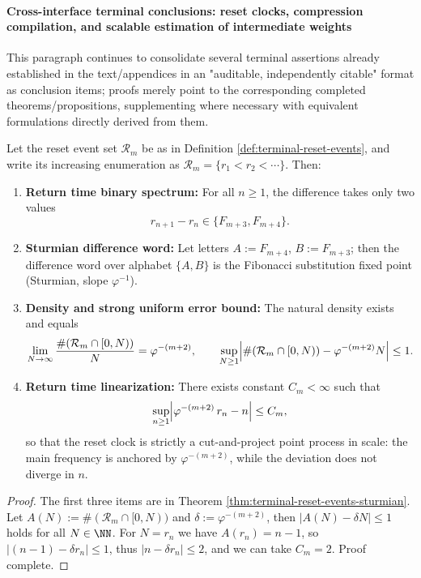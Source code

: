 \paragraph{Cross-interface terminal conclusions: reset clocks, compression compilation, and scalable estimation of intermediate weights}
This paragraph continues to consolidate several terminal assertions already established in the text/appendices in an "auditable, independently citable" format as conclusion items; proofs merely point to the corresponding completed theorems/propositions, supplementing where necessary with equivalent formulations directly derived from them.

\begin{conclusion}\label{con:xi-terminal-reset-bounded-remainder-clock}
Let the reset event set \(\mathcal R_m\) be as in Definition \ref{def:terminal-reset-events}, and write its increasing enumeration as \(\mathcal R_m=\{r_1<r_2<\cdots\}\).
Then:
\begin{enumerate}
  \item \textbf{Return time binary spectrum:} For all \(n\ge 1\), the difference takes only two values
  \[
  r_{n+1}-r_n\in\{F_{m+3},F_{m+4}\}.
  \]
  \item \textbf{Sturmian difference word:} Let letters \(A:=F_{m+4}\), \(B:=F_{m+3}\); then the difference word over alphabet \(\{A,B\}\) is the Fibonacci substitution fixed point (Sturmian, slope \(\varphi^{-1}\)).
  \item \textbf{Density and strong uniform error bound:} The natural density exists and equals
  \[
  \lim_{N\to\infty}\frac{\#(\mathcal R_m\cap[0,N))}{N}=\varphi^{-(m+2)},
  \qquad
  \sup_{N\ge 1}\Bigl|\#(\mathcal R_m\cap[0,N))-\varphi^{-(m+2)}N\Bigr|\le 1.
  \]
  \item \textbf{Return time linearization:} There exists constant \(C_m<\infty\) such that
  \[
  \sup_{n\ge 1}\Bigl|\varphi^{-(m+2)}\,r_n-n\Bigr|\le C_m,
  \]
  so that the reset clock is strictly a cut-and-project point process in scale: the main frequency is anchored by \(\varphi^{-(m+2)}\), while the deviation does not diverge in \(n\).
\end{enumerate}
\end{conclusion}
\begin{proof}[Proof]
The first three items are in Theorem \ref{thm:terminal-reset-events-sturmian}.
Let \(A(N):=\#(\mathcal R_m\cap[0,N))\) and \(\delta:=\varphi^{-(m+2)}\), then \(|A(N)-\delta N|\le 1\) holds for all \(N\in\NN\).
For \(N=r_n\) we have \(A(r_n)=n-1\), so \(|(n-1)-\delta r_n|\le 1\), thus \(|n-\delta r_n|\le 2\), and we can take \(C_m=2\). Proof complete.
\end{proof}

